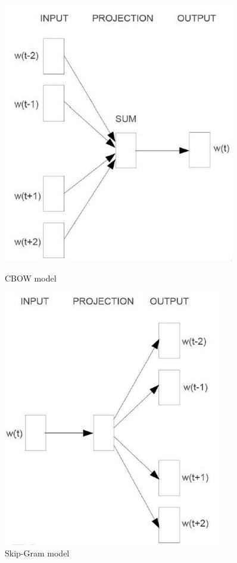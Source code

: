 \begin{center}
\begin{figure}[H]
\centering
\begin{minipage}{.5\textwidth}
 
	\includegraphics[width=0.9\textwidth]{CBOW} 
	\caption{CBOW model}
	\label{fig:CBOW}
\end{minipage}%
\begin{minipage}{.5\textwidth}
  
	\includegraphics[width=0.85\textwidth]{Skip-Gram}
	\caption{Skip-Gram model}
	\label{fig:Skip-Gram}
\end{minipage}
\end{figure}
\end{center}

